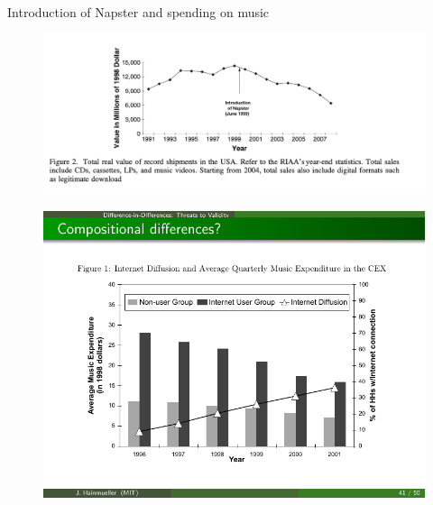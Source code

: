 \documentclass{beamer}
\begin{document}
\begin{frame}{Introduction of Napster and spending on music}
	\begin{figure}
	\includegraphics[scale=0.5]{./lecture_includes/hong_napster}
	\end{figure}

\end{frame}


\begin{frame}[plain]
	\begin{figure}
	\includegraphics{./lecture_includes/Hong_1.pdf}
	\end{figure}

\end{frame}
\end{document}
